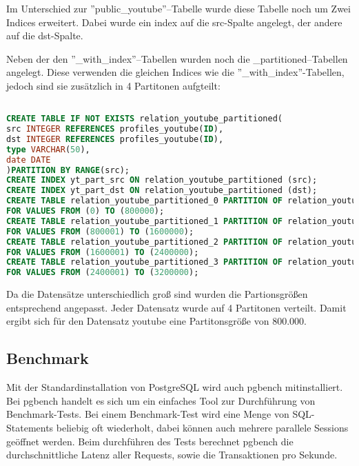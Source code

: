 Im Unterschied zur ''public\_youtube''--Tabelle wurde diese Tabelle noch um Zwei Indices erweitert. Dabei wurde ein index auf die src-Spalte angelegt, der andere auf die dst-Spalte.


Neben der den ''\_with\_index''--Tabellen wurden noch die \_partitioned--Tabellen angelegt. Diese verwenden die gleichen Indices wie die ''\_with\_index''-Tabellen, jedoch sind sie zusätzlich in 4 Partitonen aufgteilt:

\begin{lstlisting}[language=SQL,caption = Partitonierte Tabelle mit Indices anlegen,frame=single, label={lineInQueryPlan} ]

CREATE TABLE IF NOT EXISTS relation_youtube_partitioned(
src INTEGER REFERENCES profiles_youtube(ID),
dst INTEGER REFERENCES profiles_youtube(ID),
type VARCHAR(50),
date DATE
)PARTITION BY RANGE(src);
CREATE INDEX yt_part_src ON relation_youtube_partitioned (src);
CREATE INDEX yt_part_dst ON relation_youtube_partitioned (dst);
CREATE TABLE relation_youtube_partitioned_0 PARTITION OF relation_youtube_partitioned
FOR VALUES FROM (0) TO (800000);
CREATE TABLE relation_youtube_partitioned_1 PARTITION OF relation_youtube_partitioned
FOR VALUES FROM (800001) TO (1600000);
CREATE TABLE relation_youtube_partitioned_2 PARTITION OF relation_youtube_partitioned
FOR VALUES FROM (1600001) TO (2400000);
CREATE TABLE relation_youtube_partitioned_3 PARTITION OF relation_youtube_partitioned
FOR VALUES FROM (2400001) TO (3200000);
\end{lstlisting}

Da die Datensätze unterschiedlich groß sind wurden die Partionsgrößen entsprechend angepasst. Jeder Datensatz wurde auf 4 Partitonen verteilt. Damit ergibt sich für den Datensatz youtube eine Partitonsgröße von 800.000.



\subsection{Benchmark}
Mit der Standardinstallation von PostgreSQL wird auch pgbench mitinstalliert. Bei pgbench handelt es sich um ein einfaches Tool zur Durchführung von Benchmark-Tests. Bei einem Benchmark-Test wird eine Menge von \ac{SQL}-Statements beliebig oft wiederholt, dabei können auch mehrere parallele Sessions geöffnet werden. Beim durchführen des Tests berechnet pgbench die durchschnittliche Latenz aller Requests, sowie die Transaktionen pro Sekunde.
